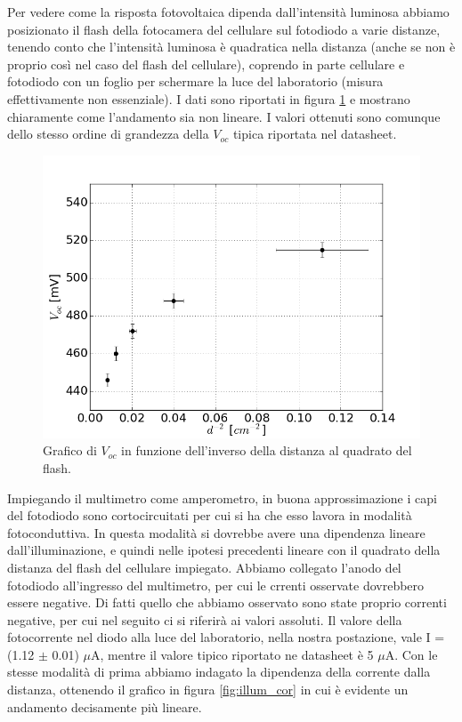 \documentclass[journal, a4paper]{IEEEtran}
\begin{document}
Per vedere come la risposta fotovoltaica dipenda dall'intensità luminosa abbiamo posizionato il flash della fotocamera del cellulare sul fotodiodo a varie distanze, tenendo conto che l'intensità luminosa è quadratica nella distanza (anche se non è proprio così nel caso del flash del cellulare), coprendo in parte cellulare e fotodiodo con un foglio per schermare la luce del laboratorio (misura effettivamente non essenziale). I dati sono riportati in figura \ref{fig:illum} e mostrano chiaramente come l'andamento sia non lineare. I valori ottenuti sono comunque dello stesso ordine di grandezza della $V_{oc}$ tipica riportata nel datasheet.

\begin{figure}[htp]
\centering
\includegraphics[scale=.4]{illum2}
\caption{Grafico di $V_{oc}$ in funzione dell'inverso della distanza al quadrato del flash.}
\label{fig:illum}
\end{figure}

Impiegando il multimetro come amperometro, in buona approssimazione i capi del fotodiodo sono cortocircuitati per cui si ha che esso lavora in modalità fotoconduttiva. In questa modalità si dovrebbe avere una dipendenza lineare dall'illuminazione, e quindi nelle ipotesi precedenti lineare con il quadrato della distanza del flash del cellulare impiegato. Abbiamo collegato l'anodo del fotodiodo all'ingresso del multimetro, per cui le crrenti osservate dovrebbero essere negative. Di fatti quello che abbiamo osservato sono state proprio correnti negative, per cui nel seguito ci si riferirà ai valori assoluti. Il valore della fotocorrente nel diodo alla luce del laboratorio, nella nostra postazione, vale I = (1.12 $\pm$ 0.01) $\mu$A, mentre il valore tipico riportato ne datasheet è 5 $\mu$A. Con le stesse modalità di prima abbiamo indagato la dipendenza della corrente dalla distanza, ottenendo il grafico in figura \ref{fig:illum_cor} in cui è evidente un andamento decisamente più lineare.
\end{document}
